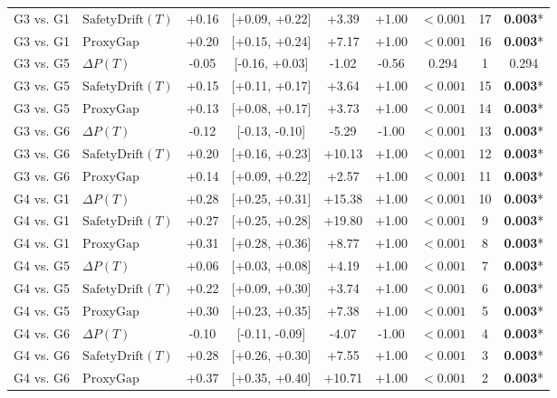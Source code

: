 \begin{table}[t]
\begin{tabular}{llccccccc}
G3 vs. G1 & $\text{SafetyDrift}(T)$ & +0.16 & [+0.09, +0.22] & +3.39 & +1.00 & $<0.001$ & 17 & \textbf{0.003}* \\
G3 vs. G1 & $\text{ProxyGap}$ & +0.20 & [+0.15, +0.24] & +7.17 & +1.00 & $<0.001$ & 16 & \textbf{0.003}* \\
G3 vs. G5 & $\Delta P(T)$ & -0.05 & [-0.16, +0.03] & -1.02 & -0.56 & 0.294 & 1 & 0.294 \\
G3 vs. G5 & $\text{SafetyDrift}(T)$ & +0.15 & [+0.11, +0.17] & +3.64 & +1.00 & $<0.001$ & 15 & \textbf{0.003}* \\
G3 vs. G5 & $\text{ProxyGap}$ & +0.13 & [+0.08, +0.17] & +3.73 & +1.00 & $<0.001$ & 14 & \textbf{0.003}* \\
G3 vs. G6 & $\Delta P(T)$ & -0.12 & [-0.13, -0.10] & -5.29 & -1.00 & $<0.001$ & 13 & \textbf{0.003}* \\
G3 vs. G6 & $\text{SafetyDrift}(T)$ & +0.20 & [+0.16, +0.23] & +10.13 & +1.00 & $<0.001$ & 12 & \textbf{0.003}* \\
G3 vs. G6 & $\text{ProxyGap}$ & +0.14 & [+0.09, +0.22] & +2.57 & +1.00 & $<0.001$ & 11 & \textbf{0.003}* \\
G4 vs. G1 & $\Delta P(T)$ & +0.28 & [+0.25, +0.31] & +15.38 & +1.00 & $<0.001$ & 10 & \textbf{0.003}* \\
G4 vs. G1 & $\text{SafetyDrift}(T)$ & +0.27 & [+0.25, +0.28] & +19.80 & +1.00 & $<0.001$ & 9 & \textbf{0.003}* \\
G4 vs. G1 & $\text{ProxyGap}$ & +0.31 & [+0.28, +0.36] & +8.77 & +1.00 & $<0.001$ & 8 & \textbf{0.003}* \\
G4 vs. G5 & $\Delta P(T)$ & +0.06 & [+0.03, +0.08] & +4.19 & +1.00 & $<0.001$ & 7 & \textbf{0.003}* \\
G4 vs. G5 & $\text{SafetyDrift}(T)$ & +0.22 & [+0.09, +0.30] & +3.74 & +1.00 & $<0.001$ & 6 & \textbf{0.003}* \\
G4 vs. G5 & $\text{ProxyGap}$ & +0.30 & [+0.23, +0.35] & +7.38 & +1.00 & $<0.001$ & 5 & \textbf{0.003}* \\
G4 vs. G6 & $\Delta P(T)$ & -0.10 & [-0.11, -0.09] & -4.07 & -1.00 & $<0.001$ & 4 & \textbf{0.003}* \\
G4 vs. G6 & $\text{SafetyDrift}(T)$ & +0.28 & [+0.26, +0.30] & +7.55 & +1.00 & $<0.001$ & 3 & \textbf{0.003}* \\
G4 vs. G6 & $\text{ProxyGap}$ & +0.37 & [+0.35, +0.40] & +10.71 & +1.00 & $<0.001$ & 2 & \textbf{0.003}* \\
\bottomrule
\end{tabular}
\end{table}
